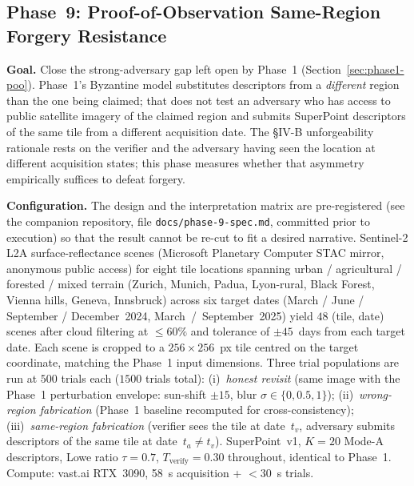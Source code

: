 \documentclass[journal,10pt,twocolumn]{IEEEtran}
\begin{document}
\subsection{Phase~9: Proof-of-Observation Same-Region Forgery Resistance}
\label{sec:phase9-forgery}

\textbf{Goal.} Close the strong-adversary gap left open by Phase~1 (Section~\ref{sec:phase1-poo}). Phase~1's Byzantine model substitutes descriptors from a \emph{different} region than the one being claimed; that does not test an adversary who has access to public satellite imagery of the claimed region and submits SuperPoint descriptors of the same tile from a different acquisition date. The §IV-B unforgeability rationale rests on the verifier and the adversary having seen the location at different acquisition states; this phase measures whether that asymmetry empirically suffices to defeat forgery.

\textbf{Configuration.} The design and the interpretation matrix are pre-registered (see the companion repository, file \texttt{docs/phase-9-spec.md}, committed prior to execution) so that the result cannot be re-cut to fit a desired narrative. Sentinel-2 L2A surface-reflectance scenes (Microsoft Planetary Computer STAC mirror, anonymous public access) for eight tile locations spanning urban / agricultural / forested / mixed terrain (Zurich, Munich, Padua, Lyon-rural, Black Forest, Vienna hills, Geneva, Innsbruck) across six target dates (March / June / September / December~2024, March~/~September~2025) yield $48$ (tile, date) scenes after cloud filtering at $\leq 60\%$ and tolerance of $\pm 45$~days from each target date. Each scene is cropped to a $256\times256$~px tile centred on the target coordinate, matching the Phase~1 input dimensions. Three trial populations are run at $500$ trials each ($1500$ trials total): (i)~\emph{honest revisit} (same image with the Phase~1 perturbation envelope: sun-shift $\pm15$, blur $\sigma\in\{0, 0.5, 1\}$); (ii)~\emph{wrong-region fabrication} (Phase~1 baseline recomputed for cross-consistency); (iii)~\emph{same-region fabrication} (verifier sees the tile at date~$t_v$, adversary submits descriptors of the same tile at date~$t_a\neq t_v$). SuperPoint~v1, $K=20$ Mode-A descriptors, Lowe ratio $\tau=0.7$, $T_\text{verify}=0.30$ throughout, identical to Phase~1. Compute: vast.ai RTX~3090, 58~s acquisition + $<30$~s trials.
\end{document}
